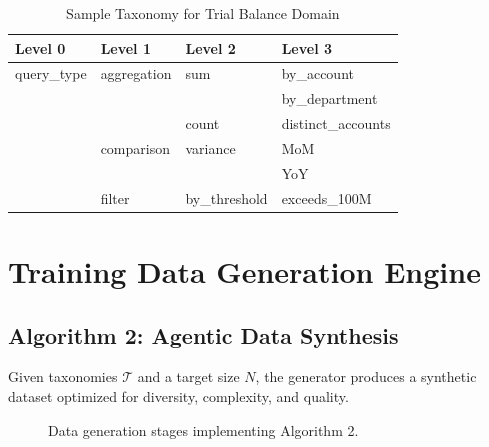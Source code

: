 \documentclass[11pt,a4paper]{article}
\begin{document}
\begin{table}[H]
\centering
\caption{Sample Taxonomy for Trial Balance Domain}
\label{tab:tb-taxonomy}
\begin{tabular}{llll}
\toprule
\textbf{Level 0} & \textbf{Level 1} & \textbf{Level 2} & \textbf{Level 3} \\
\midrule
query\_type & aggregation & sum & by\_account \\
            &             &     & by\_department \\
            &             & count & distinct\_accounts \\
            & comparison & variance & MoM \\
            &            &          & YoY \\
            & filter & by\_threshold & exceeds\_100M \\
\bottomrule
\end{tabular}
\end{table}

\newpage
\section{Training Data Generation Engine}
\label{chap:generator}

\subsection{Algorithm 2: Agentic Data Synthesis}

Given taxonomies $\mathcal{T}$ and a target size $N$, the generator produces a synthetic
dataset optimized for diversity, complexity, and quality.

\begin{figure}[H]
\centering
{}
\caption{Data generation stages implementing Algorithm 2.}
\label{fig:generator-stages}
\end{figure}
\end{document}

